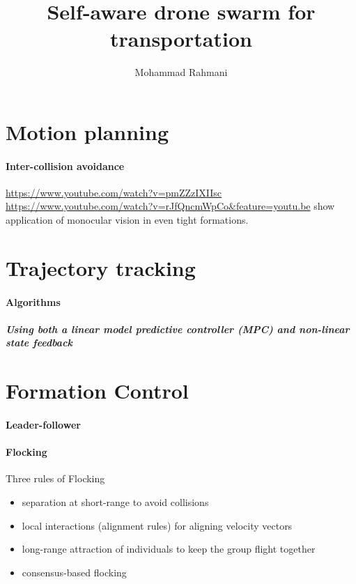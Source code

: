 \documentclass{article}
\begin{document}
	
	\title{Self-aware drone swarm for transportation}
	\author{Mohammad Rahmani}
	\date{}
	\maketitle
	\section{Motion planning}
		\paragraph{Inter-collision avoidance}
			\cite{baca-2018-model-predictive-trajectory-tracking-and-collision-avoidance-for-reliable-outdoor-deployment-of-unmanned-aerial-vehicles}
			\url{https://www.youtube.com/watch?v=pmZZzIXIIsc}
			\url{https://www.youtube.com/watch?v=rJfQncmWpCo\&feature=youtu.be} show application of monocular vision in even tight formations.
	\section{Trajectory tracking}
		\cite{baca-2018-model-predictive-trajectory-tracking-and-collision-avoidance-for-reliable-outdoor-deployment-of-unmanned-aerial-vehicles}
		\paragraph{Algorithms}
			\subparagraph{Using both a linear model predictive controller (MPC) and non-linear state feedback}
			\cite{baca-2018-model-predictive-trajectory-tracking-and-collision-avoidance-for-reliable-outdoor-deployment-of-unmanned-aerial-vehicles}
	\section{Formation Control}
		\cite{mora-2018-distributed-multi-robot-formation-control-in-dynamic-environments}
		\cite{mora-2017-multi-robot-formation-control-and-object-transport-in-dynamic-environments-via-constrained-optimization}
		\paragraph{Leader-follower}
		\paragraph{Flocking}
			Three rules of Flocking \citep{reynolds-1987-flocks-herds-and-schools-a-distributed-behavioral-model}
			\begin{itemize}
				\item separation at short-range to avoid collisions
				\item local interactions (alignment rules) for aligning velocity vectors 
				\item long-range attraction of individuals to keep the group flight together
			\end{itemize}
			\begin{itemize}
				\item  consensus-based flocking
			\end{itemize}
\end{document}
